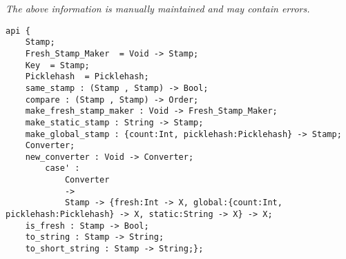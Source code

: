 \label{api:Stamp}

{\tiny \it The above information is manually maintained and may contain errors.}
\begin{verbatim}
api {
    Stamp;
    Fresh_Stamp_Maker  = Void -> Stamp;
    Key  = Stamp;
    Picklehash  = Picklehash;
    same_stamp : (Stamp , Stamp) -> Bool;
    compare : (Stamp , Stamp) -> Order;
    make_fresh_stamp_maker : Void -> Fresh_Stamp_Maker;
    make_static_stamp : String -> Stamp;
    make_global_stamp : {count:Int, picklehash:Picklehash} -> Stamp;
    Converter;
    new_converter : Void -> Converter;
        case' :
            Converter
            ->
            Stamp -> {fresh:Int -> X, global:{count:Int, picklehash:Picklehash} -> X, static:String -> X} -> X;
    is_fresh : Stamp -> Bool;
    to_string : Stamp -> String;
    to_short_string : Stamp -> String;};
\end{verbatim}
